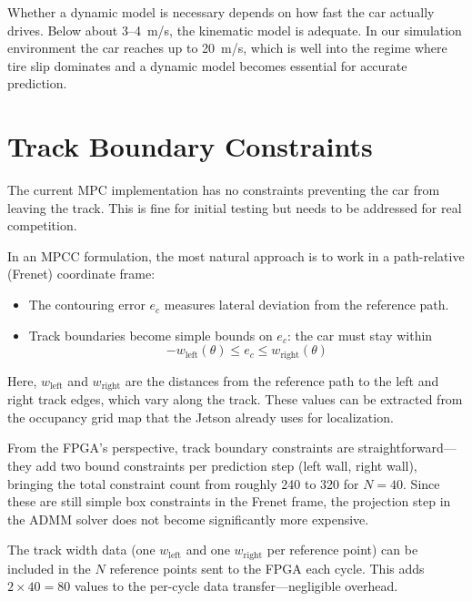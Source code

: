 \documentclass[12pt,a4paper]{article}
\begin{document}
Whether a dynamic model is necessary depends on how fast the car actually drives. Below about 3--4~m/s, the kinematic model is adequate. In our simulation environment the car reaches up to 20~m/s, which is well into the regime where tire slip dominates and a dynamic model becomes essential for accurate prediction.

\section{Track Boundary Constraints}

The current MPC implementation has no constraints preventing the car from leaving the track. This is fine for initial testing but needs to be addressed for real competition.

In an MPCC formulation, the most natural approach is to work in a path-relative (Frenet) coordinate frame:

\begin{itemize}
    \item The contouring error $e_c$ measures lateral deviation from the reference path.
    \item Track boundaries become simple bounds on $e_c$: the car must stay within
    \[
        -w_{\text{left}}(\theta) \leq e_c \leq w_{\text{right}}(\theta)
    \]
\end{itemize}

Here, $w_{\text{left}}$ and $w_{\text{right}}$ are the distances from the reference path to the left and right track edges, which vary along the track. These values can be extracted from the occupancy grid map that the Jetson already uses for localization.

From the FPGA's perspective, track boundary constraints are straightforward---they add two bound constraints per prediction step (left wall, right wall), bringing the total constraint count from roughly 240 to 320 for $N=40$. Since these are still simple box constraints in the Frenet frame, the projection step in the ADMM solver does not become significantly more expensive.

The track width data (one $w_{\text{left}}$ and one $w_{\text{right}}$ per reference point) can be included in the $N$ reference points sent to the FPGA each cycle. This adds $2 \times 40 = 80$ values to the per-cycle data transfer---negligible overhead.
\end{document}
